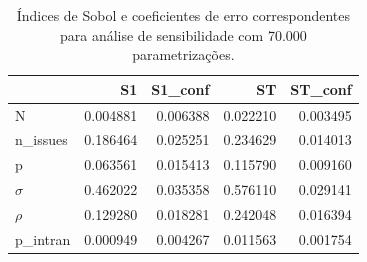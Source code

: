 \begin{table}[H]
\centering
\caption{Índices de Sobol e coeficientes de erro correspondentes para análise de
  sensibilidade com 70.000 parametrizações.}
\label{apptab1}
\begin{tabular}{l|r|r|r|r|}
\cline{2-5}
                                                        & \cellcolor[HTML]{C0C0C0}S1 & \cellcolor[HTML]{C0C0C0}S1\_conf & \cellcolor[HTML]{C0C0C0}ST & \cellcolor[HTML]{C0C0C0}ST\_conf \\ \hline
\multicolumn{1}{|l|}{\cellcolor[HTML]{EFEFEF}N}         & 0.004881                   & 0.006388                         & 0.022210                   & 0.003495                         \\ \hline
\multicolumn{1}{|l|}{\cellcolor[HTML]{EFEFEF}n\_issues} & 0.186464                   & \cellcolor[HTML]{FFFFFF}0.025251 & 0.234629                   & 0.014013                         \\ \hline
\multicolumn{1}{|l|}{\cellcolor[HTML]{EFEFEF}p}         & 0.063561                   & 0.015413                         & 0.115790                   & 0.009160                         \\ \hline
\multicolumn{1}{|l|}{\cellcolor[HTML]{EFEFEF}\(\sigma\)}         & 0.462022                   & 0.035358                         & 0.576110                   & 0.029141                         \\ \hline
\multicolumn{1}{|l|}{\cellcolor[HTML]{EFEFEF}\(\rho\)}         & 0.129280                   & 0.018281                         & 0.242048                   & 0.016394                         \\ \hline
\multicolumn{1}{|l|}{\cellcolor[HTML]{EFEFEF}p\_intran} & 0.000949                   & 0.004267                         & 0.011563                   & 0.001754                         \\ \hline
\end{tabular}
\vspace{0.1cm}
\end{table}


